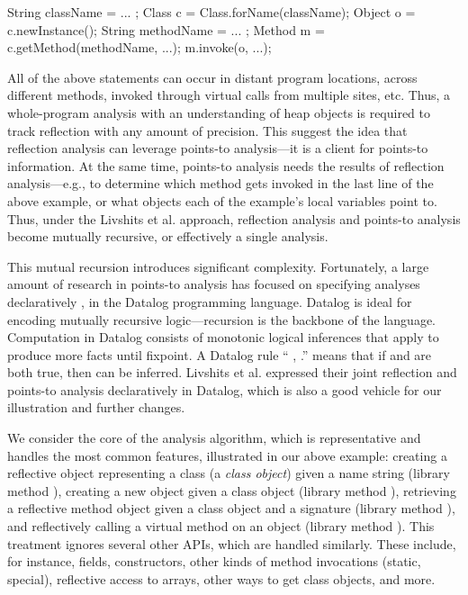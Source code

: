 \begin{javacodelinum}
String className = ... ;
Class c = Class.forName(className);
Object o = c.newInstance();
String methodName = ... ;
Method m = c.getMethod(methodName, ...);
m.invoke(o, ...);
\end{javacodelinum}

All of the above statements can occur in distant program locations,
across different methods, invoked through virtual calls from multiple
sites, etc. Thus, a whole-program analysis with an understanding of
heap objects is required to track reflection with any amount of
precision. This suggest the idea that reflection analysis can leverage
points-to analysis---it is a client for points-to information. At the
same time, points-to analysis needs the results of reflection
analysis---e.g., to determine which method gets invoked in the last
line of the above example, or what objects each of the example's local
variables point to. Thus, under the Livshits et al. approach,
reflection analysis and points-to analysis become mutually recursive,
or effectively a single analysis.

This mutual recursion introduces significant complexity.  Fortunately,
a large amount of research in points-to analysis has focused on
specifying analyses declaratively
\cite{repsdb,aplas/WhaleyACL05,pods/LamWLMACU05,pldi/WhaleyL04,oopsla/BravenboerS09,cc/KastrinisS13,issta/BravenboerS09,pldi/KastrinisS13,pldi/NaikAW06,pldi/LiangN11,uss/GuarnieriL09},
in the Datalog programming language. Datalog is ideal for encoding
mutually recursive logic---recursion is the backbone of the
language. Computation in Datalog consists of monotonic logical
inferences that apply to produce more facts until fixpoint. A Datalog
rule ``  , .''
means that if  and  are both true, then
 can be inferred. Livshits et al. expressed their joint
reflection and points-to analysis declaratively in Datalog, which is
also a good vehicle for our illustration and further changes.


We consider the core of the analysis algorithm, which is
representative and handles the most common features, illustrated in
our above example: creating a reflective object representing a class
(a \emph{class object}) given a name string (library method
), creating a new object given a class
object (library method ), retrieving
a reflective method object given a class object and a signature
(library method ), and reflectively
calling a virtual method on an object (library method
). This treatment ignores several other
APIs, which are handled similarly. These include, for instance,
fields, constructors, other kinds of method invocations (static,
special), reflective access to arrays, other ways to get class
objects, and more.


